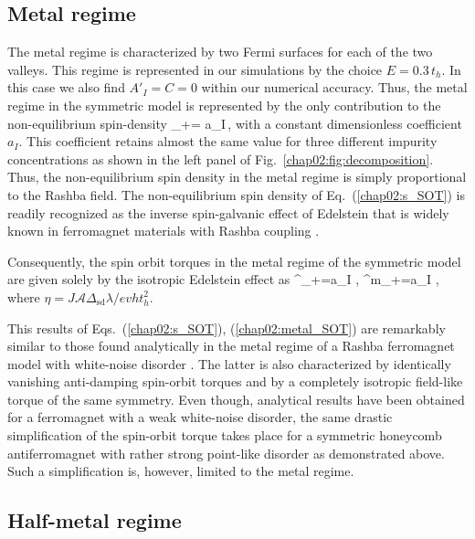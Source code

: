 \subsection{Metal regime}

The metal regime is characterized by two Fermi surfaces for each of the two valleys. This regime is represented in our simulations by the choice $E=0.3\,t_h$. In this case we also find $A'_I=C=0$ within our numerical accuracy. Thus, the metal regime in the symmetric model is represented by the only contribution to the non-equilibrium spin-density
\be
\label{chap02:s_SOT}
\delta{}_+=  a_I\,\times {}, 
\e
with a constant dimensionless coefficient $a_I$. This coefficient retains almost the same value for three different impurity concentrations as 
shown in the left panel of Fig.~\ref{chap02:fig:decomposition}. Thus, the non-equilibrium spin density in the metal regime is simply proportional to the Rashba field. The non-equilibrium spin density of Eq.~(\ref{chap02:s_SOT}) is readily recognized as the inverse spin-galvanic effect of Edelstein \cite{edelstein_spin_1990} that is widely known in ferromagnet materials with Rashba coupling \cite{manchon_theory_2008, garate_influence_2009}. 

Consequently, the spin orbit torques in the metal regime of the symmetric model are given solely by the isotropic Edelstein effect as
\be
\label{chap02:metal_SOT}
^\ell_+=a_I \eta\; \times{},\quad
{}^m_+=a_I \eta\; \!\times\!, 
\e
where $\eta=J\mathcal{A}\Delta_\text{sd}\lambda /evh t_h^2$. 

This results of Eqs.~(\ref{chap02:s_SOT}), (\ref{chap02:metal_SOT}) are remarkably similar to those found analytically in the metal regime of a Rashba ferromagnet model with white-noise disorder \cite{ado_microscopic_2017,ado_anisotropy_2019}. The latter is also characterized by identically vanishing anti-damping spin-orbit torques and by a completely isotropic field-like torque of the same symmetry. Even though, analytical results have been obtained for a ferromagnet with a weak white-noise disorder, the same drastic simplification of the spin-orbit torque takes place for a symmetric honeycomb antiferromagnet with rather strong point-like disorder as demonstrated above. Such a simplification is, however, limited to the metal regime. 
 
\subsection{Half-metal regime} 
 
